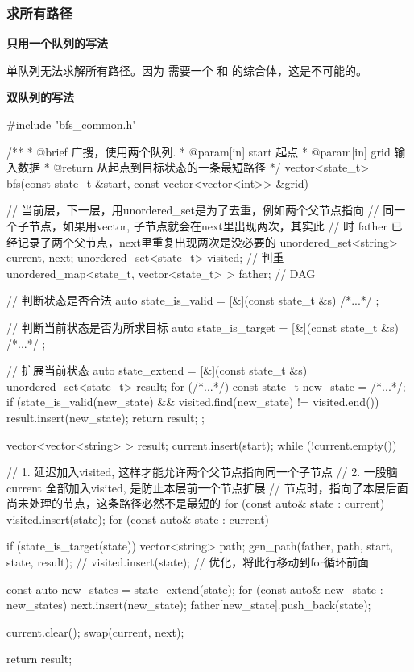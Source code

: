 \subsubsection{求所有路径}

\textbf{只用一个队列的写法}

单队列无法求解所有路径。因为 需要一个  和  的综合体，这是不可能的。


\textbf{双队列的写法}

\begin{Codex}[label=bfs_template.cpp]
#include "bfs_common.h"

/**
 * @brief 广搜，使用两个队列.
 * @param[in] start 起点
 * @param[in] grid 输入数据
 * @return 从起点到目标状态的一条最短路径
 */
vector<state_t> bfs(const state_t &start, const vector<vector<int>> &grid) {
    // 当前层，下一层，用unordered_set是为了去重，例如两个父节点指向
    // 同一个子节点，如果用vector, 子节点就会在next里出现两次，其实此
    // 时 father 已经记录了两个父节点，next里重复出现两次是没必要的
    unordered_set<string> current, next;
    unordered_set<state_t> visited; // 判重
    unordered_map<state_t, vector<state_t> > father; // DAG


    // 判断状态是否合法
    auto state_is_valid = [&](const state_t &s) { /*...*/ };

    // 判断当前状态是否为所求目标
    auto state_is_target = [&](const state_t &s) { /*...*/ };

    // 扩展当前状态
    auto state_extend = [&](const state_t &s) {
        unordered_set<state_t> result;
        for (/*...*/) {
            const state_t new_state = /*...*/;
            if (state_is_valid(new_state) && 
                    visited.find(new_state) != visited.end()) {
                result.insert(new_state);
            }
        }
        return result;
    };

    vector<vector<string> > result;
    current.insert(start);
    while (!current.empty()) {
        // 1. 延迟加入visited, 这样才能允许两个父节点指向同一个子节点
        // 2. 一股脑current 全部加入visited, 是防止本层前一个节点扩展
        // 节点时，指向了本层后面尚未处理的节点，这条路径必然不是最短的
        for (const auto& state : current)
            visited.insert(state);
        for (const auto& state : current) {
            if (state_is_target(state)) {
                vector<string> path;
                gen_path(father, path, start, state, result);
            }
            // visited.insert(state); // 优化，将此行移动到for循环前面

            const auto new_states = state_extend(state);
            for (const auto& new_state : new_states) {
                next.insert(new_state);
                father[new_state].push_back(state);
            }
        }

        current.clear();
        swap(current, next);
    }

    return result;
}
\end{Codex}
